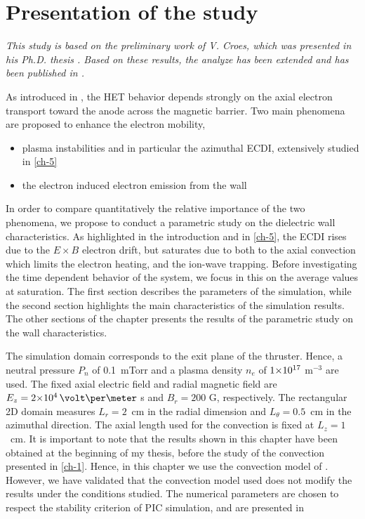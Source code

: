 
\section{Presentation of the study}
  \label{sec-params}
  
  \begin{Chabstract}
    
  \emph{This study is based on the preliminary work of V. Croes, which was presented in his Ph.D. thesis \citep{croes2017}.
  Based on these results, the analyze has been extended and has been published in  \citet{tavant2018}.}
\end{Chabstract}
  
  \vspace{1ex}
  
  
  As introduced in , the \ac{HET} behavior depends strongly on the axial electron transport toward the anode across the magnetic barrier.
  Two main phenomena are proposed to enhance the electron mobility,
  \begin{itemize}
    \item plasma instabilities and in particular the azimuthal \ac{ECDI}, extensively studied in \cref{ch-5}
    \item the electron induced electron emission from the wall
  \end{itemize}
  In order to compare quantitatively the relative importance of the two phenomena, we propose to conduct a parametric study on the dielectric wall characteristics.
  As highlighted in the introduction and in \cref{ch-5}, the \ac{ECDI} rises due to the $E \times B$ electron drift, but saturates due to both to the axial convection which limits the electron heating, and the ion-wave trapping.
  Before investigating the time dependent behavior of the system, we focus in this  on the average values at saturation.
  The first section describes the parameters of the simulation, 
  while the second section highlights the main characteristics of the simulation results.
  The other sections of the chapter presents the results of the parametric study on the wall characteristics.

  
  The simulation domain corresponds to the exit plane of the thruster.
  Hence, a neutral pressure $P_n$ of 0.1~mTorr and a plasma density $n_e$ of ${{1}{\times}10^{17}}$ m$^{-3}$ are used.
  The fixed axial electric field and radial magnetic field are $E_z=\sn{2}{4}\,\volt\per\meter$ s and $B_r=200$ G, respectively.
  The rectangular \ac{2D} domain measures $L_r=2$~cm in the radial dimension and $L_{\theta}=0.5$~cm in the azimuthal direction.
  The axial length used for the convection is fixed at $L_z=1$~cm.
  It is important to note that the results shown in this chapter have been obtained at the beginning of my thesis, before the study of the convection presented in \cref{ch-1}.
  Hence, in this chapter we use the convection model of \citet{lafleur2016a}.
  However, we have validated that the convection model used does not modify the results under the conditions studied.
  The numerical parameters are chosen to respect the stability criterion of \ac{PIC} simulation, and are presented in 
  

